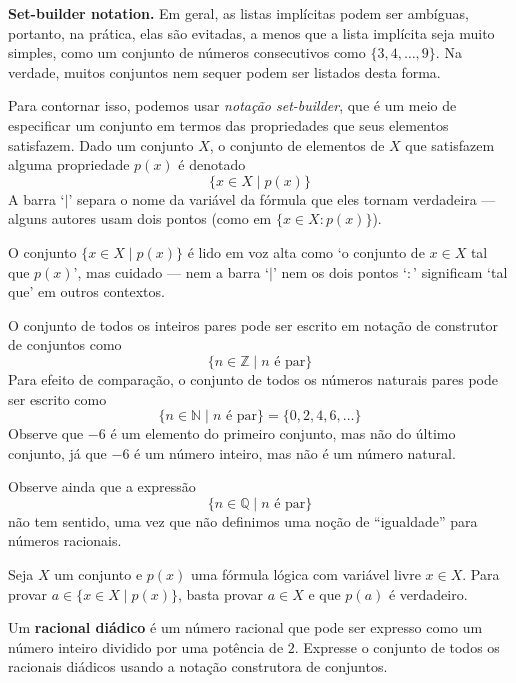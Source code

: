 \textbf{Set-builder notation.}
Em geral, as listas implícitas podem ser ambíguas, portanto, na prática, elas são evitadas, a menos que a lista implícita seja muito simples, como um conjunto de números consecutivos como $\{3, 4, \dots, 9 \}$. Na verdade, muitos conjuntos nem sequer podem ser listados desta forma.

Para contornar isso, podemos usar \textit{notação set-builder}, que é um meio de especificar um conjunto em termos das propriedades que seus elementos satisfazem. Dado um conjunto $X$, o conjunto de elementos de $X$ que satisfazem alguma propriedade $p(x)$ é denotado
\[ \{ x \in X \mid p(x) \} \]
A barra `$\mid$'  separa o nome da variável da fórmula que eles tornam verdadeira --- alguns autores usam dois pontos (como em $\{ x \in X : p(x) \}$).

O conjunto $\{ x \in X \mid p(x) \}$ é lido em voz alta como `o conjunto de $x \in X$ tal que $p(x)$', mas cuidado --- nem a barra `$\mid$' nem os dois pontos `$:$' significam `tal que' em outros contextos.

\begin{example}
\label{exSetsSpecifyUniverses}
O conjunto de todos os inteiros pares pode ser escrito em notação de construtor de conjuntos como
\[ \{ n \in \mathbb{Z} \mid n \text{ é par} \} \]
Para efeito de comparação, o conjunto de todos os números naturais pares pode ser escrito como
\[ \{ n \in \mathbb{N} \mid n \text{ é par} \} = \{ 0, 2, 4, 6, \dots \} \]
Observe que $-6$ é um elemento do primeiro conjunto, mas não do último conjunto, já que $-6$ é um número inteiro, mas não é um número natural.

Observe ainda que a expressão
\[ \{ n \in \mathbb{Q} \mid n \text{ é par} \} \]
não tem sentido, uma vez que não definimos uma noção de “igualdade” para números racionais.
\end{example}

\begin{strategy}
Seja $X$ um conjunto e $p(x)$ uma fórmula lógica com variável livre $x \in X$. Para provar $a \in \{ x \in X \mid p(x) \}$, basta provar $a \in X$ e que $p(a)$ é verdadeiro.
\end{strategy}

\begin{exercise}
\label{exDyadicRatioal}
Um \textbf{racional diádico} é um número racional que pode ser expresso como um número inteiro dividido por uma potência de $2$. Expresse o conjunto de todos os racionais diádicos usando a notação construtora de conjuntos.
\end{exercise}

